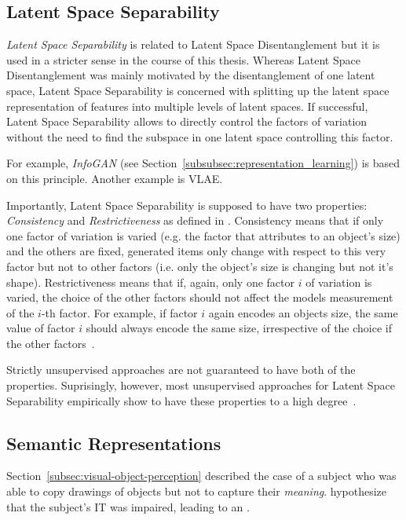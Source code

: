 \subsection{Latent Space Separability}\label{subsec:feature-separability}

\textit{Latent Space Separability} is related to Latent Space Disentanglement but it is used in a stricter sense in the course of this thesis.
Whereas Latent Space Disentanglement was mainly motivated by the disentanglement of one latent space, Latent Space Separability is concerned with splitting up the latent space representation of features into multiple levels of latent spaces.
If successful, Latent Space Separability allows to directly control the factors of variation without the need to find the subspace in one latent space controlling this factor.

For example, \textit{InfoGAN} (see Section~\ref{subsubsec:representation_learning}) is based on this principle.
Another example is \ac{VLAE}.

Importantly, Latent Space Separability is supposed to have two properties: \textit{Consistency} and \textit{Restrictiveness} as defined in \citet{Shu2020Weakly}.
Consistency means that if only one factor of variation is varied (e.g. the factor that attributes to an object's size) and the others are fixed, generated items only change with respect to this very factor but not to other factors (i.e. only the object's size is changing but not it's shape).
Restrictiveness means that if, again, only one factor $i$ of variation is varied, the choice of the other factors should not affect the models measurement of the $i$-th factor.
For example, if factor $i$ again encodes an objects size, the same value of factor $i$ should always encode the same size, irrespective of the choice if the other factors~\citep{Shu2020Weakly}.

Strictly unsupervised approaches are not guaranteed to have both of the properties.
Suprisingly, however, most unsupervised approaches for Latent Space Separability empirically show to have these properties to a high degree~\citep{Shu2020Weakly}.

\subsection{Semantic Representations}\label{subsec:semantic-representations}

Section~\ref{subsec:visual-object-perception} described the case of a subject who was able to copy drawings of objects but not to capture their \textit{meaning}.
\citet[pp. 1069, 1070]{squire2012fundamental} hypothesize that the subject's \ac{IT} was impaired, leading to an .

